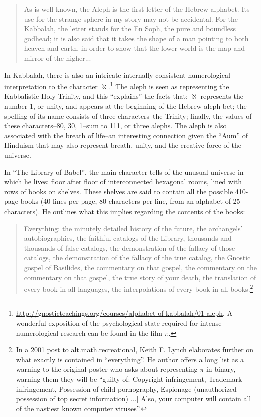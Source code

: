 \documentclass{thesis}
\begin{document}
	\begin{quote}
	As is well known, the Aleph is the first letter of the Hebrew alphabet. Its use for the strange sphere in my story may not be accidental. For the Kabbalah, the letter stands for the En Soph, the pure and boundless godhead; it is also said that it takes the shape of a man pointing to both heaven and earth, in order to show that the lower world is the map and mirror of the higher...
	\end{quote}
	
	In Kabbalah, there is also an intricate internally consistent numerological interpretation to the character $\aleph$.\footnote{\url{http://gnosticteachings.org/courses/alphabet-of-kabbalah/01-aleph}. A wonderful exposition of the psychological state required for intense numerological research can be found in the film $\pi$.} The aleph is seen as representing the Kabbalistic Holy Trinity, and this ``explains'' the facts that: $\aleph$ represents the number 1, or unity, and appears at the beginning of the Hebrew aleph-bet; the spelling of its name consists of three characters--the Trinity; finally, the values of these characters--80, 30, 1--sum to 111, or three alephs. The aleph is also associated with the breath of life--an interesting connection given the ``Aum'' of Hinduism that may also represent breath, unity, and the creative force of the universe.
	
	In ``The Library of Babel'', the main character tells of the unusual universe in which he lives: floor after floor of interconnected hexagonal rooms, lined with rows of books on shelves. These shelves are said to contain all the possible 410-page books (40 lines per page, 80 characters per line, from an alphabet of 25 characters). He outlines what this implies regarding the contents of the books:
	
	\begin{quote}
	Everything: the minutely detailed history of the future, the archangels' autobiographies, the faithful catalogs of the Library, thousands and thousands of false catalogs, the demonstration of the fallacy of those catalogs, the demonstration of the fallacy of the true catalog, the Gnostic gospel of Basilides, the commentary on that gospel, the commentary on the commentary on that gospel, the true story of your death, the translation of every book in all languages, the interpolations of every book in all books.\footnote{In a 2001 post to alt.math.recreational, Keith F. Lynch elaborates further on what exactly is contained in ``everything''.\cite{keith_f._lynch_converting_????} He author offers a long list as a warning to the original poster who asks about representing $\pi$ in binary, warning them they will be ``guilty of: Copyright infringement, Trademark infringement, Possession of child pornography, Espionage (unauthorized possession of top secret information)[...] Also, your computer will contain all of the nastiest known computer viruses''.}
	\end{quote}
	
\end{document}
